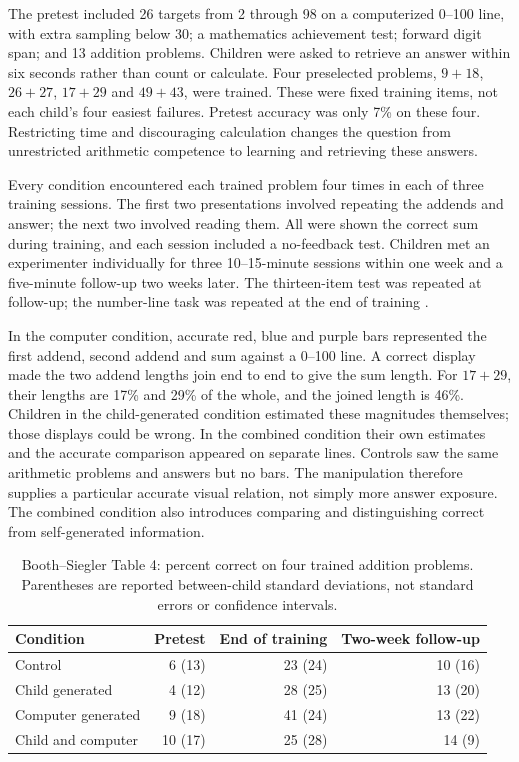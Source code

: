 The pretest included 26 targets from 2 through 98 on a computerized
0--100 line, with extra sampling below 30; a mathematics achievement
test; forward digit span; and 13 addition problems. Children were
asked to retrieve an answer within six seconds rather than count
or calculate. Four preselected problems, \(9+18\), \(26+27\),
\(17+29\) and \(49+43\), were trained. These were fixed training
items, not each child's four easiest failures. Pretest accuracy
was only 7\% on these four. Restricting time and discouraging
calculation changes the question from unrestricted arithmetic
competence to learning and retrieving these answers.

Every condition encountered each trained problem four times in
each of three training sessions. The first two presentations involved
repeating the addends and answer; the next two involved reading them.
All were shown the correct sum during training, and each session
included a no-feedback test. Children met an experimenter individually
for three 10--15-minute sessions within one week and a five-minute
follow-up two weeks later. The thirteen-item test was repeated at
follow-up; the number-line task was repeated at the end of training
\cite[pp.~1020--1023 and Table 1]{BoothSiegler2008ArithmeticNL}.

In the computer condition, accurate red, blue and purple bars
represented the first addend, second addend and sum against a
0--100 line. A correct display made the two addend lengths join
end to end to give the sum length. For \(17+29\), their lengths
are 17\% and 29\% of the whole, and the joined length is 46\%.
Children in the child-generated condition estimated these magnitudes
themselves; those displays could be wrong. In the combined condition
their own estimates and the accurate comparison appeared on separate
lines. Controls saw the same arithmetic problems and answers but
no bars. The manipulation therefore supplies a particular accurate
visual relation, not simply more answer exposure. The combined
condition also introduces comparing and distinguishing correct from
self-generated information.

\begin{table}[htbp]
\centering
\small
\caption{Booth--Siegler Table 4: percent correct on four trained
addition problems. Parentheses are reported between-child standard
deviations, not standard errors or confidence intervals.}
\label{tab:p19-nl-arithmetic-results}
\begin{tabular}{lrrr}
\hline
Condition & Pretest & End of training & Two-week follow-up\\
\hline
Control & 6 (13) & 23 (24) & 10 (16)\\
Child generated & 4 (12) & 28 (25) & 13 (20)\\
Computer generated & 9 (18) & 41 (24) & 13 (22)\\
Child and computer & 10 (17) & 25 (28) & 14 (9)\\
\hline
\end{tabular}
\end{table}

